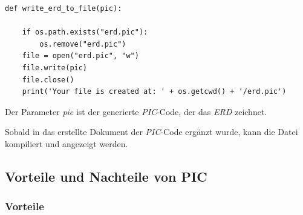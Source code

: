 \lstset{language=Python}
\lstset{frame=lines}
\lstset{basicstyle=\footnotesize}
\begin{lstlisting}
def write_erd_to_file(pic):

    if os.path.exists("erd.pic"):
        os.remove("erd.pic")
    file = open("erd.pic", "w")
    file.write(pic)  
    file.close()
    print('Your file is created at: ' + os.getcwd() + '/erd.pic')

\end{lstlisting}

\noindent
Der Parameter \textit{pic} ist der generierte \textit{PIC}-Code, der das \textit{ERD} zeichnet.

\noindent
Sobald in das erstellte Dokument der \textit{PIC}-Code ergänzt wurde, kann die Datei kompiliert und angezeigt werden.

\subsection{Vorteile und Nachteile von PIC}
\pra

\subsubsection{Vorteile}

